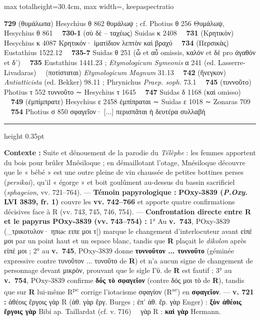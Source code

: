 \documentclass[11pt,twoside]{book}
\newcommand{\italique}[1]{\textit{#1}}
\newcommand{\expo}[1]{\textsuperscript{#1}}
\newcommand{\R}{\textbf{R}}
\newcommand{\Rpc}{R\expo{pc}}
\newcommand{\Rac}{R\expo{ac}}
\newcommand{\PsiDeux}{POxy-3839}
\newcommand{\Eustathe}{Eustathius }
\newcommand{\EtymMagnum}{\textit{Etymologicum Magnum} }
\newcommand{\EtymSym}{\textit{Etymologicum Symeonis} }
\newcommand{\Phryn}{Phrynichus \textit{Praep. soph.} }
\newcommand{\Antiatt}{\textit{Antiatticista} (ed. Bekker) }
\newcommand{\lecon}[1]{\textbf{#1}}
\newcommand{\espApp}{\ {\color{ruleGold}{\policeFr ∥}}\ }
\newcommand{\espTest}{\ {\color{ruleGold}{\policeFr ∥}}\ }
\begin{document}
\begin{adjustbox}{max totalheight=30.4cm, max width=\textwidth, keepaspectratio}
\begin{minipage}{\textwidth}
{ \textbf{729} (θυμάλωπα) Hesychius θ 862 θυμάλωψ ; cf. Photius θ 256 Θυμάλωψ, Hesychius θ 861 \espTest \textbf{730-1} (σὺ δὲ -- ταχέως) Suidas κ 2408 \espTest \textbf{731} (Κρητικὸν) Hesychius κ 4087 Κρητικόν· ἱματίδιον λεπτὸν καὶ βραχύ \espTest \textbf{734} (Περσικὰς) \Eustathe 1522.12 \espTest \textbf{735-7} Suidas θ 251 (ὦ et αὖ omissis, καλόν et δὲ pro ἀγαθόν et δ᾽) \espTest \textbf{735} \Eustathe 1441.23 ; \EtymSym α 241 (ed. Lasserre-Livadaras) \espTest (ποτίσταται) \EtymMagnum 31.13 \espTest \textbf{742} (ἤνεγκον) \Antiatt 98.11 ; \Phryn 73.1 \espTest \textbf{745} (τυννοῦτο) Photius τ 552 τυννοῦτο {\policeFr ∼} Hesychius τ 1645 \espTest \textbf{747} Suidas δ 1168 (καὶ omisso) \espTest \textbf{749} (ἐμπίμπρατε) Hesychius ε 2458 ἐμπίπραται {\policeFr ∼} Suidas ε 1018 {\policeFr ∼} Zonaras 709 \espTest \textbf{754} Photius σ 850 σφαγεῖον· [...] περισπᾶται ἡ δευτέρα συλλαβή\par\vspace{2.5pt}
{\color{ruleGold}\hrule height 0.35pt}\vspace{2.5pt}
 \textbf{Contexte :} Suite et dénouement de la parodie du \italique{Télèphe} : les femmes apportent du bois pour brûler Mnésiloque ; en démaillotant l'otage, Mnésiloque découvre que le « bébé » est une outre pleine de vin chaussée de petites bottines perses (\italique{persikai}), qu'il « égorge » et boit goulûment au-dessus du bassin sacrificiel (\italique{sphageion}, vv. 721–764). --- \textbf{Témoin papyrologique :} \textbf{\PsiDeux{} (\italique{P.Oxy.} LVI 3839, fr. 1)} couvre les \textbf{vv. 742–766} et apporte quatre confirmations décisives face à R (vv. 743, 745, 746, 754). --- \textbf{Confrontation directe entre R et le papyrus \PsiDeux{} (vv. 743–754) :} 1° Au \textbf{v.~743}, \PsiDeux{} (\_τρικοτυλον· ηπωc ειπε μοι τ[) marque le changement d'interlocuteur avant εἰπέ μοι par un point haut et un espace blanc, tandis que \R{} plaçait le \italique{dikolon} après εἰπέ μοι ; 2° au \textbf{v.~745}, \PsiDeux{} donne \lecon{τυννοῦτον ... τυννοῦτο} (géminée expressive contre τυνοῦτον ... τυνοῦτο de \R{}) et n'a aucun signe de changement de personnage devant μικρὸν, prouvant que le sigle Γϋ. de \R{} est fautif ; 3° au \textbf{v.~754}, \PsiDeux{} confirme \lecon{δός τὸ σφαγεῖον} (contre δός μοι τὸ de \R{}), tandis que sur \R{} lui-même \Rpc{} corrige l'iotacisme σφαγίον (\Rac{}) en \lecon{σφαγεῖον}. --- \textbf{v. 721 :} ἀθέοις ἔργοις γὰρ R (ἀθ. γὰρ ἔργ. Burges ; ἐπ' ἀθ. ἔρ. γὰρ Enger) : \lecon{ξὺν ἀθέοις ἔργοις γὰρ} Bibi ap. Taillardat (cf. v. 716) \espApp γὰρ R : \lecon{καὶ γὰρ} Hermann.\par}
\end{minipage}\end{adjustbox}
\end{document}
